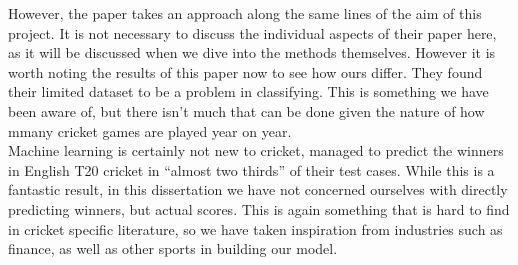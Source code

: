 However, the paper \cite{kumar} takes an approach along the same lines of the aim of this project. It is not necessary to discuss the individual aspects
of their paper here, as it will be discussed when we dive into the methods themselves. However it is worth noting the results of this paper now to see how
ours differ. They found their limited dataset to be a problem in classifying. This is something we have been aware of, but there isn't much that can be done
given the nature of how mmany cricket games are played year on year. \\

Machine learning is certainly not new to cricket, \cite{kampakis} managed to predict the winners in English T20 cricket in ``almost two thirds'' of their test cases. While this 
is a fantastic result, in this dissertation we have not concerned ourselves with directly predicting winners, but actual scores. This is again something that is hard to find 
in cricket specific literature, so we have taken inspiration from industries such as finance, as well as other sports in building our model. 
